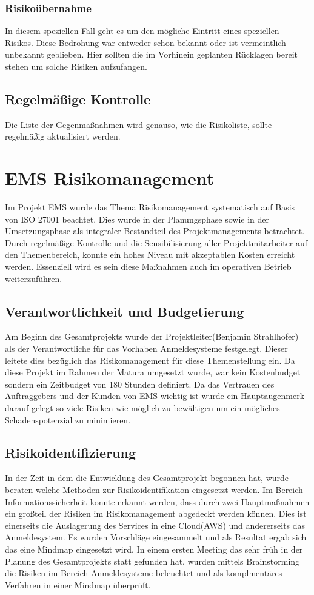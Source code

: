 \subsubsection{Risikoübernahme}
In diesem speziellen Fall geht es um den mögliche Eintritt eines speziellen Risikos. Diese Bedrohung war entweder schon bekannt oder ist vermeintlich unbekannt geblieben. Hier sollten die im Vorhinein geplanten Rücklagen bereit stehen um solche Risiken aufzufangen.

\subsection{Regelmäßige Kontrolle}
Die Liste der Gegenmaßnahmen wird genauso, wie die Risikoliste, sollte regelmäßig aktualisiert werden.  


\section{EMS Risikomanagement}
Im Projekt EMS wurde das Thema Risikomanagement systematisch auf Basis von ISO 27001 beachtet. Dies wurde in der Planungsphase sowie in der Umsetzungsphase als integraler Bestandteil des Projektmanagements betrachtet. Durch regelmäßige Kontrolle und die Sensibilisierung aller Projektmitarbeiter auf den Themenbereich, konnte ein hohes Niveau mit akzeptablen Kosten erreicht werden. Essenziell wird es sein diese Maßnahmen auch im operativen Betrieb weiterzuführen.

\subsection{Verantwortlichkeit und Budgetierung}
Am Beginn des Gesamtprojekts wurde der Projektleiter(Benjamin Strahlhofer) als der Verantwortliche für das Vorhaben Anmeldesysteme festgelegt. Dieser leitete dies bezüglich das Risikomanagement für diese Themenstellung ein.
Da diese Projekt im Rahmen der Matura umgesetzt wurde, war kein Kostenbudget sondern ein Zeitbudget von 180 Stunden definiert. Da das Vertrauen des Auftraggebers und der Kunden von EMS wichtig ist wurde ein Hauptaugenmerk darauf gelegt so viele Risiken wie möglich zu bewältigen um ein mögliches Schadenspotenzial zu minimieren.

\subsection{Risikoidentifizierung}
In der Zeit in dem die Entwicklung des Gesamtprojekt begonnen hat, wurde beraten welche Methoden zur Risikoidentifikation eingesetzt werden. Im Bereich Informationssicherheit konnte erkannt werden, dass durch zwei Hauptmaßnahmen ein großteil der Risiken im Risikomanagement abgedeckt werden können. Dies ist einerseits die Auslagerung des Services in eine Cloud(AWS) und andererseits das Anmeldesystem. Es wurden Vorschläge eingesammelt und als Resultat ergab sich das eine Mindmap eingesetzt wird.
In einem ersten Meeting das sehr früh in der Planung des Gesamtprojekts statt gefunden hat, wurden mittels Brainstorming die Risiken im Bereich Anmeldesysteme beleuchtet und als komplmentäres Verfahren in einer Mindmap überprüft.

